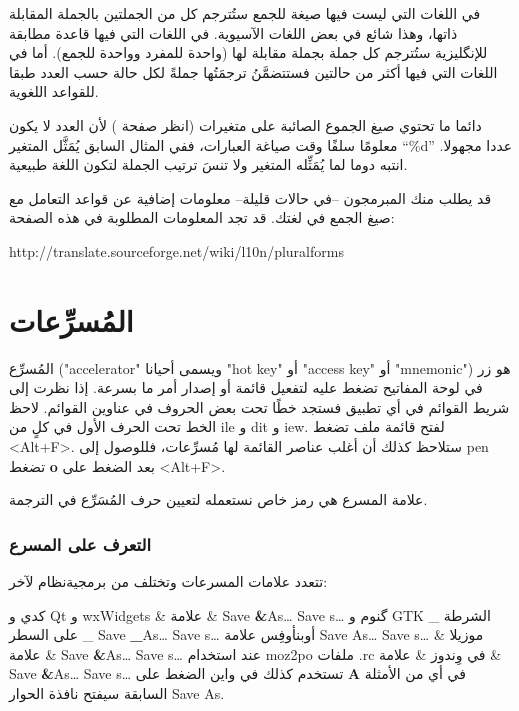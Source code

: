 في اللغات التي ليست فيها صيغة للجمع ستُترجم كل من الجملتين بالجملة
المقابلة ذاتها، وهذا شائع في بعض اللغات الآسيوية. في اللغات التي فيها
قاعدة مطابقة للإنگليزية ستُترجم كل جملة بجملة مقابلة لها (واحدة للمفرد
وواحدة للجمع). أما في اللغات التي فيها أكثر من حالتين فستتضمَّنُ
ترجمَتُها جملةً لكل حالة حسب العدد طبقا للقواعد اللغوية.

دائما ما تحتوي صيغ الجموع الصائبة على متغيرات (انظر صفحة
\at[ref:33556809]) لأن العدد لا يكون معلومًا سلفًا وقت صياغة
العبارات، ففي المثال السابق يُمَثَّل المتغير ‪“\%d”‬ عددا مجهولا. انتبه
دوما لما يُمَثِّله المتغير ولا تنسَ ترتيب الجملة لتكون اللغة طبيعية.

قد يطلب منك المبرمجون --في حالات قليلة-- معلومات إضافية عن قواعد التعامل
مع صيغ الجمع في لغتك. قد تجد المعلومات المطلوبة في هذه الصفحة:

http://translate.sourceforge.net/wiki/l10n/pluralforms

\section[ref:34484726]{المُسرِّعات}
المُسرِّع ("accelerator" ويسمى
أحيانا "hot key" أو "access key" أو "mnemonic") هو زر في لوحة المفاتيح
تضغط عليه لتفعيل قائمة أو إصدار أمر ما بسرعة. إذا نظرت إلى شريط القوائم
في أي تطبيق فستجد خطًا تحت بعض الحروف في عناوين القوائم. لاحظ الخط تحت
الحرف الأول في كلٍ من ile و dit و
iew. لفتح قائمة ملف تضغط <Alt+F>. ستلاحظ كذلك أن أغلب عناصر
القائمة لها مُسرِّعات، فللوصول إلى pen تضغط {\bf o} بعد
الضغط على <Alt+F>.

علامة المسرع هي رمز خاص نستعمله لتعيين حرف المُسَرِّع في الترجمة.

\subsubsection{التعرف على المسرع}
تتعدد علامات المسرعات وتختلف من برمجية نظام لآخر:

\starttable[|l|l|l|l|l|l|]
\HL
\NC {} \NC {} \NC
{} \NC {} \NC
{} \NC {}\NC\AR
\HL
\NC كدي و Qt و wxWidgets \NC \&  \NC علامة \& \NC Save {\bf \&}As…  \NC
Save s… \NC \NC\AR
\HL
\NC گنوم و GTK \NC \_  \NC الشرطة على السطر \_ \NC Save {\bf \_}As…  \NC
Save s… \NC \NC\AR
\HL
\NC أوبن​أوفِس \NC {}   \NC علامة   \NC Save {\bf
{} }As…  \NC Save s… \NC \NC\AR
\HL
\NC موزيلا \NC \&  \NC علامة \& \NC Save {\bf \&}As…  \NC Save
s… \NC عند استخدام moz2po \NC\AR
\HL
\NC ملفات .rc في وِندوز  \NC \&  \NC علامة \& \NC Save {\bf \&}As…  \NC
Save s… \NC تستخدم كذلك في واين\NC\AR
\HL
\stoptable
الضغط على {\bf A} في أي من الأمثلة السابقة سيفتح نافذة الحوار Save As.


